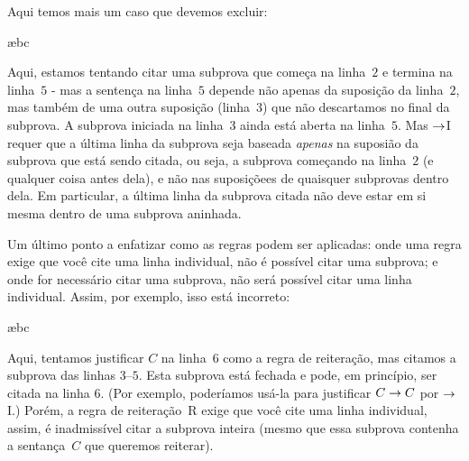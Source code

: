 Aqui temos mais um caso que devemos excluir:
\begin{fitchproof}
\open
	\open
	\ae{bc}
	\close
\close
{}
 
\end{fitchproof}
Aqui, estamos tentando citar uma subprova que come\c ca na linha~$2$ e termina na linha~$5$ -  mas a senten\c ca na linha~$5$ depende n\~ao apenas da suposi\c c\~ao da linha~$2$, mas tamb\'em de uma outra suposi\c c\~ao (linha~$3$) que n\~ao descartamos no final da subprova.  A subprova iniciada na linha~$3$ ainda est\'a aberta na linha~$5$.  Mas $\rightarrow$I requer que a \'ultima linha da subprova seja baseada \emph{apenas} na suposi\~ao da subprova  que est\'a sendo citada, ou seja, a subprova come\c cando na linha~$2$ (e qualquer coisa antes dela), e n\~ao nas suposi\c c\~oees de quaisquer subprovas dentro dela.  Em particular, a \'ultima linha da subprova citada n\~ao deve estar em si mesma dentro de uma subprova aninhada.



Um \'ultimo ponto a enfatizar como as regras podem ser aplicadas: onde uma regra exige que voc\^e cite uma linha individual, n\~ao \'e poss\'ivel citar uma subprova; e onde for necess\'ario citar uma subprova, n\~ao ser\'a poss\'ivel citar uma linha individual.  Assim, por exemplo, isso est\'a incorreto:
\begin{fitchproof}
\open
	\open
	\ae{bc}
	\close
 
\close
{}
\end{fitchproof}
Aqui, tentamos justificar $C$ na linha~$6$ como a regra de reitera\c c\~ao, mas citamos a subprova das linhas $3$--$5$. Esta subprova est\'a fechada e pode, em princ\'ipio, ser citada na linha 6.  (Por exemplo, poder\'iamos us\'a-la para justificar 
 $C \rightarrow C$ por $\rightarrow$I.) Por\'em,  a regra de reitera\c c\~ao~R exige que voc\^e cite uma linha individual, assim, \'e inadmiss\'ivel citar a subprova inteira (mesmo que essa subprova  contenha a sentan\c ca~$C$  que queremos reiterar).

